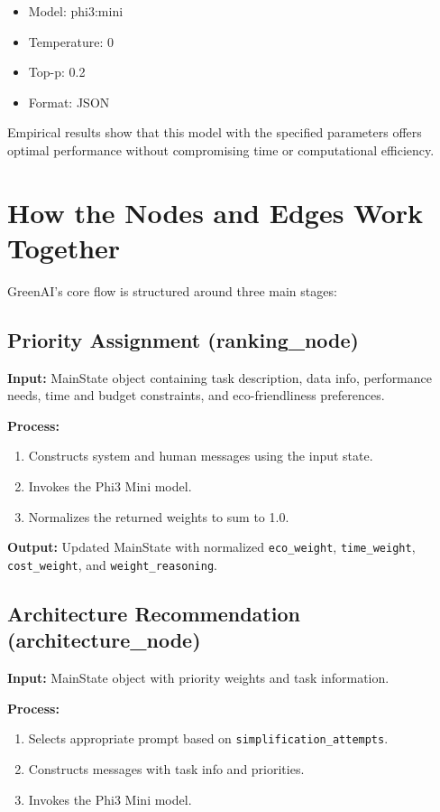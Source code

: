 \documentclass{report}
\begin{document}
\begin{itemize}
    \item Model: phi3:mini
    \item Temperature: 0
    \item Top-p: 0.2
    \item Format: JSON
\end{itemize}

Empirical results show that this model with the specified parameters offers optimal performance without compromising time or computational efficiency.
\section{How the Nodes and Edges Work Together}

GreenAI's core flow is structured around three main stages:

\subsection{Priority Assignment (ranking\_node)}
\textbf{Input:} MainState object containing task description, data info, performance needs, time and budget constraints, and eco-friendliness preferences.

\vspace{0.2cm}

\textbf{Process:}
\begin{enumerate}
    \item Constructs system and human messages using the input state.
    \item Invokes the Phi3 Mini model.
    \item Normalizes the returned weights to sum to 1.0.
\end{enumerate}

\textbf{Output:} Updated MainState with normalized \texttt{eco\_weight}, \texttt{time\_weight}, \texttt{cost\_weight}, and \texttt{weight\_reasoning}.

\subsection{Architecture Recommendation (architecture\_node)}
\textbf{Input:} MainState object with priority weights and task information.

\vspace{0.2cm}

\textbf{Process:}
\begin{enumerate}
    \item Selects appropriate prompt based on \texttt{simplification\_attempts}.
    \item Constructs messages with task info and priorities.
    \item Invokes the Phi3 Mini model.
\end{enumerate}
\end{document}
